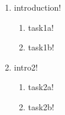 \begin{enumerate}

    \item introduction!
    \begin{enumerate}
        \item task1a!
        \item task1b!
    \end{enumerate}

    \item intro2!
    \begin{enumerate}
        \item task2a!
        \item task2b!
    \end{enumerate}

\end{enumerate}